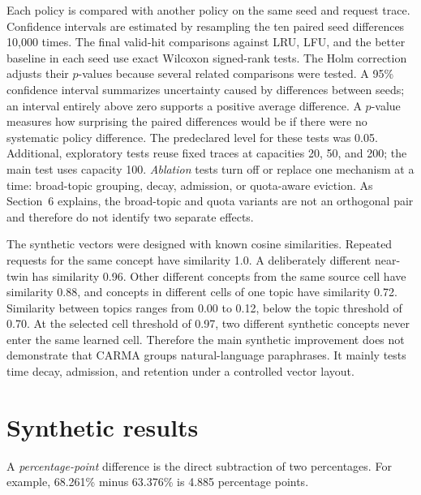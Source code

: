 \documentclass[10pt,letterpaper]{article}
\begin{document}
Each policy is compared with another policy on the same seed and request
trace. Confidence intervals are estimated by resampling the ten paired seed
differences 10,000 times. The final valid-hit comparisons against LRU, LFU,
and the better baseline in each seed use exact Wilcoxon signed-rank tests. The
Holm correction adjusts their $p$-values because several related comparisons
were tested. A 95\% confidence interval summarizes uncertainty caused by
differences between seeds; an interval entirely above zero supports a positive
average difference. A $p$-value measures how surprising the paired differences
would be if there were no systematic policy difference. The predeclared level
for these tests was 0.05. Additional, exploratory tests reuse fixed traces at capacities
20, 50, and 200; the main test uses capacity 100. \emph{Ablation} tests turn
off or replace one mechanism at a time: broad-topic grouping, decay, admission,
or quota-aware eviction. As Section~6 explains, the broad-topic and quota
variants are not an orthogonal pair and therefore do not identify two separate
effects.

The synthetic vectors were designed with known cosine similarities. Repeated
requests for the same concept have similarity 1.0. A deliberately different
near-twin has similarity 0.96. Other different concepts from the same source
cell have similarity 0.88, and concepts in different cells of one topic have
similarity 0.72. Similarity between topics ranges from 0.00 to 0.12, below the
topic threshold of 0.70. At the selected cell threshold of 0.97, two different
synthetic concepts never enter the same learned cell. Therefore the main
synthetic improvement does not demonstrate that CARMA groups natural-language
paraphrases. It mainly tests time decay, admission, and retention under a
controlled vector layout.

\section{Synthetic results}

A \emph{percentage-point} difference is the direct subtraction of two
percentages. For example, 68.261\% minus 63.376\% is 4.885 percentage points.
\end{document}

